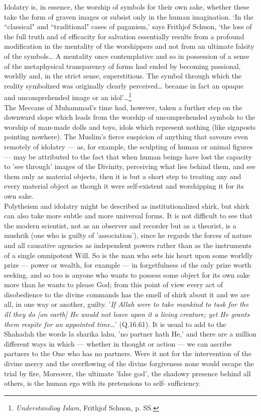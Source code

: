 \documentclass[10pt, twoside]{book}
\begin{document}
Idolatry is, in essence, the worship of symbols for their own sake, whether these take the form of 
graven images or subsist only in the human imagination. `In the ``classical" and ``traditional" cases 
of paganism,' says Frithjof Schuon, `the loss of the full truth and of efficacity for salvation 
essentially results from a profound modification in the mentality of the worshippers and not from an 
ultimate falsity of the symbols\ldots{} A mentality once contemplative and so in possession of a sense of 
the metaphysical transparency of forms had ended by becoming passional, worldly and, in the strict 
sense, superstitious. The symbol through which the reality symbolized was originally clearly 
perceived\ldots{} became in fact an opaque and uncomprehended image or an idol'\ldots{}\footnote{\emph{Understandiog Islam}, Frithjof Schuon, p. SS.} \\

The Meccans of Muhammad's time had, however, taken a further step on the downward slope which leads 
from the worship of uncomprehended symbols to the worship of man\hyp{}made dolls and toys, idols which 
represent nothing (like signposts pointing nowhere). The Muslim's fierce suspicion of anything that 
savours even remotely of idolatry --- as, for example, the sculpting of human or animal figures --- may 
be attributed to the fact that when human beings have lost the capacity to 'see through' images of 
the Divinity, perceiving what lies behind them, and see them only as material objects, then it is but 
a short step to treating any and every material object as though it were self\hyp{}existent and 
worshipping it for its own sake. \\

Polytheism and idolatry might be described as institutionalized shirk, but shirk can also take more 
subtle and more universal forms. It is not difficult to see that the modern scientist, not as an 
observer and recorder but as a theorist, is a mushrik (one who is guilty of 'association'), since he 
regards the forces of nature and all causative agencies as independent powers rather than as the 
instruments of a single omnipotent Will. So is the man who sets his heart upon some worldly prize --- 
power or wealth, for example --- in forgetfulness of the only prize worth seeking, and so too is anyone 
who wants to possess some object for its own sake more than he wants to please God; from this point 
of view every act of disobedience to the divine commands has the smell of shirk about it and we are 
all, in one way or another, guilty. '\emph{If Allah were to take mankind to task for the ill they do [on 
earth] He would not leave upon it a living creature; yet He grants them respite for an appointed 
time\ldots{}}' (Q.16.61). It is usual to add to the Shahadah the words la sharika lahu, 'no partner hath 
He,' and there are a million different ways in which --- whether in thought or action --- we can ascribe 
partners to the One who has no partners. Were it not for the intervention of the divine mercy and the 
overflowing of the divine forgiveness none would escape the trial by fire, Moreover, the ultimate 
'false god', the shadowy presence behind all others, is the human ego with its pretensions to self\hyp{}
sufficiency. \\
\end{document}
